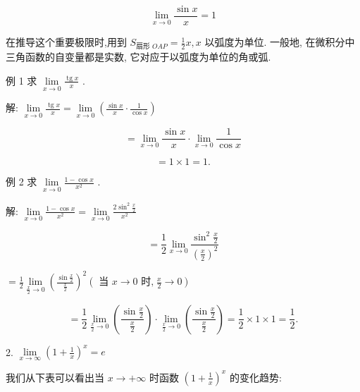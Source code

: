 \documentclass[10pt]{article}
\begin{document}
\[
\mathop{\lim }\limits_{{x \rightarrow 0}}\frac{\sin x}{x} = 1
\]

在推导这个重要极限时,用到 \({S}_{\text{扇形 }{OAP}} = \frac{1}{2}x,x\) 以弧度为单位. 一般地, 在微积分中三角函数的自变量都是实数, 它对应于以弧度为单位的角或弧.

例 1 求 \(\mathop{\lim }\limits_{{x \rightarrow 0}}\frac{\operatorname{tg}x}{x}\) .

解: \(\mathop{\lim }\limits_{{x \rightarrow 0}}\frac{\operatorname{tg}x}{x} = \mathop{\lim }\limits_{{x \rightarrow 0}}\left( {\frac{\sin x}{x} \cdot \frac{1}{\cos x}}\right)\)

\[
= \mathop{\lim }\limits_{{x \rightarrow 0}}\frac{\sin x}{x} \cdot \mathop{\lim }\limits_{{x \rightarrow 0}}\frac{1}{\cos x}
\]

\[
= 1 \times 1 = 1\text{.}
\]

例 2 求 \(\mathop{\lim }\limits_{{x \rightarrow 0}}\frac{1 - \cos x}{{x}^{2}}\) .

解: \(\mathop{\lim }\limits_{{x \rightarrow 0}}\frac{1 - \cos x}{{x}^{2}} = \mathop{\lim }\limits_{{x \rightarrow 0}}\frac{2{\sin }^{2}\frac{x}{2}}{{x}^{2}}\)

\[
= \frac{1}{2}\mathop{\lim }\limits_{{x \rightarrow 0}}\frac{{\sin }^{2}\frac{x}{2}}{{\left( \frac{x}{2}\right) }^{2}}
\]

\(= \frac{1}{2}\mathop{\lim }\limits_{{\frac{x}{2} \rightarrow 0}}{\left( \frac{\sin \frac{x}{2}}{\frac{x}{2}}\right) }^{2}\left( {\text{ 当 }x \rightarrow 0\text{ 时,}\;\frac{x}{2} \rightarrow 0}\right)\)

\[
= \frac{1}{2}\mathop{\lim }\limits_{{\frac{x}{2} \rightarrow 0}}\left( \frac{\sin \frac{x}{2}}{\frac{x}{2}}\right) \cdot \mathop{\lim }\limits_{{\frac{x}{2} \rightarrow 0}}\left( \frac{\sin \frac{x}{2}}{\frac{x}{2}}\right) = \frac{1}{2} \times 1 \times 1 = \frac{1}{2}\text{.}
\]

2. \(\mathop{\lim }\limits_{{x \rightarrow \infty }}{\left( 1 + \frac{1}{x}\right) }^{x} = e\)

我们从下表可以看出当 \(x \rightarrow + \infty\) 时函数 \({\left( 1 + \frac{1}{x}\right) }^{x}\) 的变化趋势:
\end{document}
